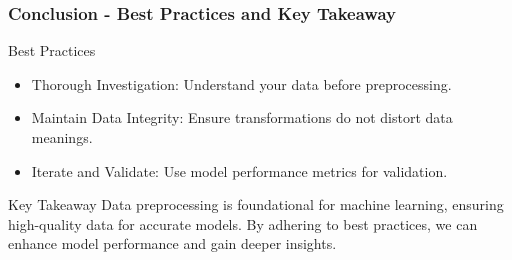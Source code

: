 \documentclass[aspectratio=169]{beamer}
\begin{document}
\begin{frame}[fragile]
    \frametitle{Conclusion - Best Practices and Key Takeaway}
    \begin{block}{Best Practices}
        \begin{itemize}
            \item Thorough Investigation: Understand your data before preprocessing.
            \item Maintain Data Integrity: Ensure transformations do not distort data meanings.
            \item Iterate and Validate: Use model performance metrics for validation.
        \end{itemize}
    \end{block}
    
    \begin{block}{Key Takeaway}
        Data preprocessing is foundational for machine learning, ensuring high-quality data for accurate models. By adhering to best practices, we can enhance model performance and gain deeper insights.
    \end{block}
\end{frame}
\end{document}
